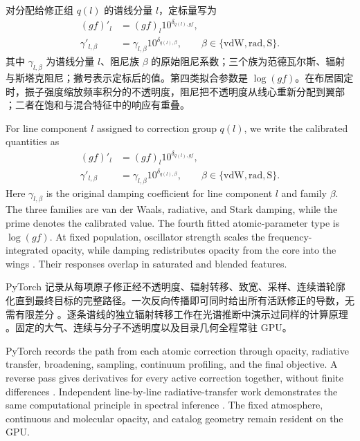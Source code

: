 对分配给修正组 $q(l)$ 的谱线分量 $l$，定标量写为
\begin{equation}
\begin{aligned}
(gf)'_l &= (gf)_l 10^{\delta_{q(l),gf}},\\
\gamma'_{l,\beta} &= \gamma_{l,\beta}10^{\delta_{q(l),\beta}},
\qquad \beta\in\{\mathrm{vdW},\mathrm{rad},\mathrm{S}\}.
\end{aligned}
\end{equation}
\noindent 其中 $\gamma_{l,\beta}$ 为谱线分量 $l$、阻尼族 $\beta$ 的原始阻尼系数；三个族为范德瓦尔斯、辐射与斯塔克阻尼；撇号表示定标后的值。第四类拟合参数是 $\log(gf)$。在布居固定时，振子强度缩放频率积分的不透明度，阻尼把不透明度从线心重新分配到翼部 \citep{Barklem2000,Gray2005}；二者在饱和与混合特征中的响应有重叠。

\begin{EN}
For line component $l$ assigned to correction group $q(l)$, we write the
calibrated quantities as
\begin{equation}
\begin{aligned}
(gf)'_l &= (gf)_l 10^{\delta_{q(l),gf}},\\
\gamma'_{l,\beta} &= \gamma_{l,\beta}10^{\delta_{q(l),\beta}},
\qquad \beta\in\{\mathrm{vdW},\mathrm{rad},\mathrm{S}\}.
\end{aligned}
\label{eq:atomic_calibration_parameters}
\end{equation}
\noindent Here $\gamma_{l,\beta}$ is the original damping coefficient for line
component $l$ and family $\beta$. The three families are van der Waals,
radiative, and Stark damping, while the prime denotes the calibrated value.
The fourth fitted atomic-parameter type is $\log(gf)$. At fixed population, oscillator strength
scales the frequency-integrated opacity, while damping redistributes opacity
from the core into the wings \citep{Barklem2000,Gray2005}. Their responses
overlap in saturated and blended features.
\end{EN}

PyTorch 记录从每项原子修正经不透明度、辐射转移、致宽、采样、连续谱轮廓化直到最终目标的完整路径。一次反向传播即可同时给出所有活跃修正的导数，无需有限差分 \citep{Baydin2015}。逐条谱线的独立辐射转移工作在光谱推断中演示过同样的计算原理 \citep{Kawahara2022}。固定的大气、连续与分子不透明度以及目录几何全程常驻 GPU。

\begin{EN}
PyTorch records the path from each atomic correction through opacity,
radiative transfer, broadening, sampling, continuum profiling, and the final
objective. A reverse pass gives derivatives for every active correction
together, without finite differences \citep{Baydin2015}. Independent
line-by-line radiative-transfer work demonstrates the same computational
principle in spectral inference \citep{Kawahara2022}. The fixed atmosphere, continuous and
molecular opacity, and catalog geometry remain resident on the GPU.
\end{EN}

